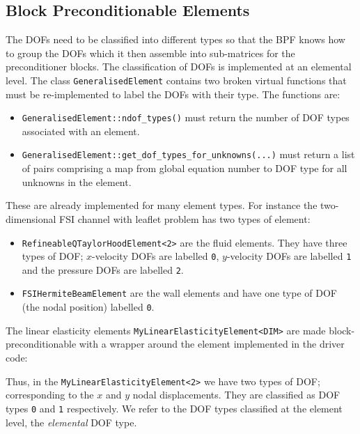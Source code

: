 \subsection{Block Preconditionable Elements\label{sec:block_preconditionable_elements}}
The DOFs need to be classified into different types so that the BPF knows how
to group the DOFs which it then assemble into sub-matrices for the 
preconditioner blocks. The classification of DOFs is implemented at an 
elemental level. The class \texttt{GeneralisedElement} contains two broken 
virtual functions that must be re-implemented to label the DOFs with their 
type. The functions are:
\begin{itemize}
\item \texttt{GeneralisedElement::ndof\_types()} must return the number of DOF 
types associated with an element.
\item \texttt{GeneralisedElement::get\_dof\_types\_for\_unknowns(...)} 
must return a list of pairs comprising a map from global equation number to DOF
type for all unknowns in the element.
\end{itemize}
These are already implemented for many element types. For instance the 
two-dimensional FSI channel with leaflet problem has two types of element:
\begin{itemize}
\item \texttt{RefineableQTaylorHoodElement<2>} are the fluid elements. They have
three types of DOF; $x$-velocity DOFs are labelled \texttt{0}, $y$-velocity DOFs
are labelled \texttt{1} and the pressure DOFs are labelled \texttt{2}.
\item \texttt{FSIHermiteBeamElement} are the wall elements and have one type of
  DOF (the nodal position) labelled \texttt{0}.
\end{itemize}
The linear elasticity elements \texttt{MyLinearElasticityElement<DIM>} are made 
block-preconditionable with a wrapper around the element implemented in the 
driver code:
\lstset{numberfirstline=true,numberstyle=\scriptsize,breaklines=true, numbers=left, stepnumber=2, frame=single,basicstyle=\ttfamily\scriptsize, showstringspaces=false, language=C++}

Thus, in the \texttt{MyLinearElasticityElement<2>} we have two types of DOF; 
corresponding to the $x$ and $y$ nodal displacements. They are classified as 
DOF types \texttt{0} and \texttt{1} respectively. We refer to the DOF types classified at the element level, the \emph{elemental} DOF type.

